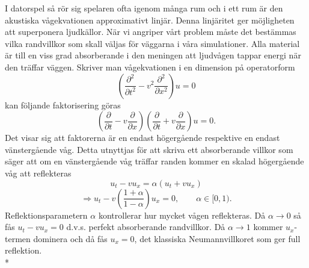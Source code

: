 I datorspel så rör sig spelaren ofta igenom många rum och i ett rum är den akustiska vågekvationen approximativt linjär. Denna linjäritet ger möjligheten att superponera ljudkällor. När vi angriper vårt problem måste det bestämmas vilka randvillkor som skall väljas för väggarna i våra simulationer. Alla material är till en viss grad absorberande i den meningen att ljudvågen tappar energi när den träffar väggen. Skriver man vågekvationen i en dimension på operatorform
\begin{equation}
\left(\frac{\partial^{2}}{\partial t^{2}} - v^{2}\frac{\partial^{2}}{\partial x^{2}}\right)u = 0
\end{equation}
kan följande faktorisering göras
\begin{equation}
\left(\frac{\partial}{\partial t} - v\frac{\partial}{\partial x}\right)\left(\frac{\partial}{\partial t} + v\frac{\partial}{\partial x}\right)u = 0.
\end{equation}
Det visar sig att faktorerna är en endast högergående respektive en endast vänstergående våg. Detta utnyttjas för att skriva ett absorberande villkor som säger att om en vänstergående våg träffar randen kommer en skalad högergående våg att reflekteras
\begin{equation*}
u_{t} - vu_{x} = \alpha\left(u_{t} + vu_{x}\right) 
\end{equation*}
\begin{equation} \label{eq:abc}
\Rightarrow u_{t} - v\left(\frac{1 + \alpha}{1 - \alpha}\right)u_{x} = 0, \qquad \alpha \in [0,1).
\end{equation}
Reflektionsparametern $\alpha$ kontrollerar hur mycket vågen reflekteras.
Då $\alpha \rightarrow 0$ så fås $u_{t} - vu_{x} = 0$ d.v.s. perfekt absorberande randvillkor. Då $\alpha \rightarrow 1$ kommer $u_{x}$-termen dominera och då fås $u_{x} = 0$, det klassiska Neumannvillkoret som ger full reflektion.\\*
\newline